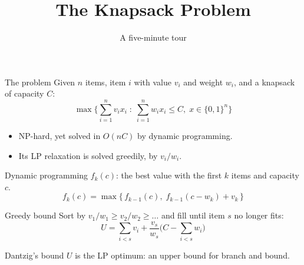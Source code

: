 \documentclass[aspectratio=169]{beamer}
\title{The Knapsack Problem}
\subtitle{A five-minute tour}
\date{}
\begin{document}
\maketitle

\begin{frame}{The problem}
  Given $n$ items, item $i$ with value $v_i$ and weight $w_i$,
  and a knapsack of capacity $C$:
  \[
    \max \Big\{ \sum_{i=1}^{n} v_i x_i \;:\;
    \sum_{i=1}^{n} w_i x_i \le C,\; x \in \{0,1\}^n \Big\}
  \]
  \begin{itemize}
  \item NP-hard, yet solved in $O(nC)$ by dynamic programming.
  \item Its LP relaxation is solved greedily, by $v_i / w_i$.
  \end{itemize}
\end{frame}

\begin{frame}{Dynamic programming}
  $f_k(c)$: the best value with the first $k$ items and capacity $c$.
  \[
    f_k(c) = \max\{\, f_{k-1}(c),\; f_{k-1}(c - w_k) + v_k \,\}
  \]
  \begin{center}
  \end{center}
\end{frame}

\begin{frame}{Greedy bound}
  Sort by $v_1/w_1 \ge v_2/w_2 \ge \dots$ and fill until item $s$ no longer fits:
  \[
    U = \sum_{i<s} v_i + \frac{v_s}{w_s}\Big(C - \sum_{i<s} w_i\Big)
  \]
  \begin{block}{Dantzig's bound}
    $U$ is the LP optimum: an upper bound for branch and bound.
  \end{block}
\end{frame}
\end{document}
